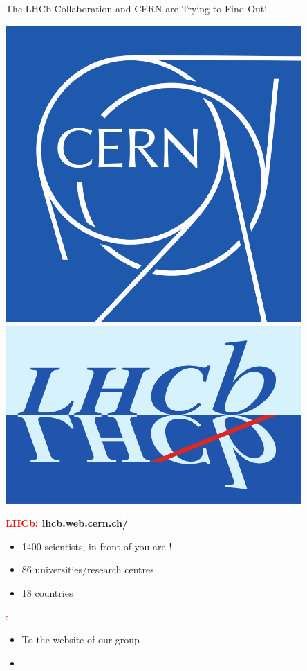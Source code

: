 \begin{frame}{The LHCb Collaboration and CERN are Trying to Find Out!}
\begin{minipage}{0.21\textwidth} \begin{center}
\includegraphics[width=0.85\textwidth]{Logos And Group/CERN_logo.png} \\ \vspace{.75cm}
\includegraphics[width=0.85\textwidth]{Logos And Group/LHCb_Logo.png} \\ \vspace{.75cm}
\LogoInsitute
\end{center}\end{minipage}\begin{minipage}{0.82\textwidth}
\textbf{\textcolor{red}{LHCb:} lhcb.web.cern.ch/}
\begin{itemize}
\item 1400 scientists, in front of you are \NumPeople!
\item 86 universities/research centres
\item 18 countries
\vspace{0.5cm}
\end{itemize}\textcolor{red}{\WorkGroup:}\begin{itemize}
    
\item To the website of our group
\item[] \textbf{\WorkGroupWebsite}
\end{itemize}
\end{minipage}

\end{frame}
